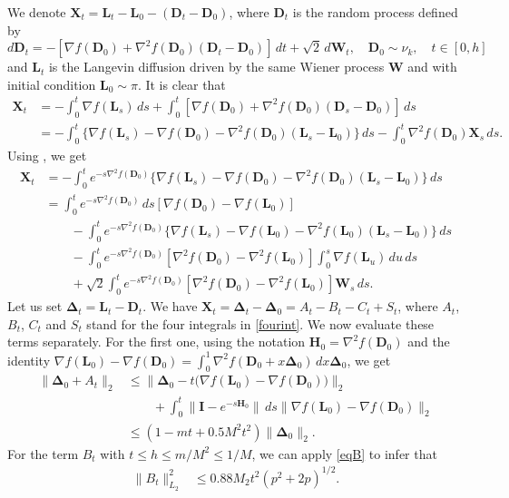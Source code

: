 \documentclass[aoap,preprint,reqno,a4paper]{imsart} %
\newcommand{\bDelta}{\boldsymbol{\Delta}}
\newcommand{\bfH}{\mathbf H}
\newcommand{\bfI}{\mathbf I}
\newcommand{\bW}{\boldsymbol W\!}
\newcommand{\bD}{\boldsymbol D}
\newcommand{\bL}{\boldsymbol L}
\newcommand{\bX}{\boldsymbol X}
\begin{document}
We denote $\bX_t = \bL_t -\bL_0- (\bD_t-\bD_0)$, where $\bD_t$ is the random process defined by
$$
d\bD_t= -[\nabla f(\bD_0) + \nabla^2 f(\bD_0)(\bD_t-\bD_0)]\,dt+\sqrt{2}\,d\bW_t,\quad \bD_0 \sim \nu_k,\quad t\in[0,h]
$$
and $\bL_t$ is the Langevin diffusion driven by the same Wiener process $\bW$ and with initial
condition $\bL_0\sim\pi$. It is clear that
\begin{align}
\bX_t
		&= -\int_0^t \nabla f(\bL_s)\,ds+\int_0^t[\nabla f(\bD_0) + \nabla^2 f(\bD_0)(\bD_s-\bD_0)]\,ds\\
		&= -\int_0^t \big\{\nabla f(\bL_s)-\nabla f(\bD_0)-\nabla^2 f(\bD_0)(\bL_s-\bL_0)\big\}\,ds
		-\int_0^t \nabla^2 f(\bD_0)\bX_s\,ds.
\end{align}
Using , we get
\begin{align}
\bX_t
		&= -\int_0^t e^{-s\nabla^2 f(\bD_0)} \big\{\nabla f(\bL_s)-\nabla f(\bD_0)-\nabla^2 f(\bD_0)(\bL_s-\bL_0)\big\}\,ds\\
		&=  \int_0^t e^{-s\nabla^2 f(\bD_0)}\,ds [\nabla f(\bD_0)-\nabla f(\bL_0)]\\
		&\qquad -\int_0^t e^{-s\nabla^2 f(\bD_0)}
		\big\{\nabla f(\bL_s)-\nabla f(\bL_0)-\nabla^2 f(\bL_0)(\bL_s-\bL_0)\big\}\,ds\\
		&\qquad -\int_0^t e^{-s\nabla^2 f(\bD_0)}
		[\nabla^2 f(\bD_0)-\nabla^2 f(\bL_0)]\int_0^s \nabla f(\bL_u)\,du\,ds\\
		&\qquad +\sqrt{2}\int_0^t e^{-s\nabla^2 f(\bD_0)}
		[\nabla^2 f(\bD_0)-\nabla^2 f(\bL_0)]\bW_s\,ds.		\label{fourint}
\end{align}
Let us set $\bDelta_t = \bL_t-\bD_t$. We have $\bX_t = \bDelta_t-\bDelta_0 = A_t-B_t-C_t+S_t$,
where $A_t$, $B_t$, $C_t$ and $S_t$ stand for the four integrals in \eqref{fourint}. We now evaluate
these terms separately. For the first one, using the notation $\bfH_0 = \nabla^2 f(\bD_0)$ and
the identity $\nabla f(\bL_0)-\nabla f(\bD_0) = \int_0^1 \nabla^2 f(\bD_0+x\bDelta_0)\,dx \bDelta_0$,
we get
\begin{align}
\|\bDelta_0+A_t\|_2
		&\le \|\bDelta_0-t\big(\nabla f(\bL_0)-\nabla f(\bD_0)\big)\|_2 \\
		&\qquad+ \int_0^t\|\bfI-e^{-s\bfH_0}\|\,ds
		\big\|\nabla f(\bL_0)-\nabla f(\bD_0)\big\|_2\\
		&\le (1-mt + 0.5M^2t^2)\|\bDelta_0\|_2.\label{At}
\end{align}
For the term $B_t$ with $t\le h\le m/M^2\le 1/M$, we can apply \eqref{eqB} to infer that
\begin{align}
\|B_t\|_{L_2}^2
		&\le 0.88 M_2t^2(p^2+2p)^{1/2}.\label{Bt}
\end{align}
\end{document}
